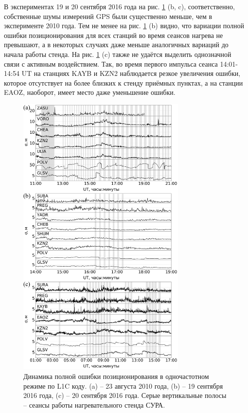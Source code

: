 В экспериментах 19 и 20 сентября 2016 года на рис. \ref{fig-l1c-sura} (b, c), соответственно, собственные шумы измерений GPS были существенно меньше, чем в эксперименте 2010 года.
Тем не менее на рис. \ref{fig-l1c-sura} (b) видно, что вариации полной ошибки позиционирования для всех станций во время сеансов нагрева не превышают, а в некоторых случаях даже меньше аналогичных вариаций до начала работы стенда. 
На рис. \ref{fig-l1c-sura} (c) также не удаётся выделить однозначной связи с активным воздействием. 
Так, во время первого импульса сеанса 14:01-14:54 UT на станциях KAYB и KZN2 наблюдается резкое увеличения ошибки, которое отсутствует на более близких к стенду приёмных пунктах, а на станции EAOZ, наоборот, имеет место даже уменьшение ошибки. 
\begin{figure}[h]
\centering    
\includegraphics[width=0.75\textwidth]{fig/l1c-sura.png}    
\caption{Динамика полной ошибки позиционирования в одночастотном режиме по L1C коду. (a) -- 23 августа 2010 года, (b) -- 19 сентября 2016 года, (c) -- 20 сентября 2016 года. Серые вертикальные полосы -- сеансы работы нагревательного стенда СУРА.}
\label{fig-l1c-sura}      
\end{figure} 
\clearpage